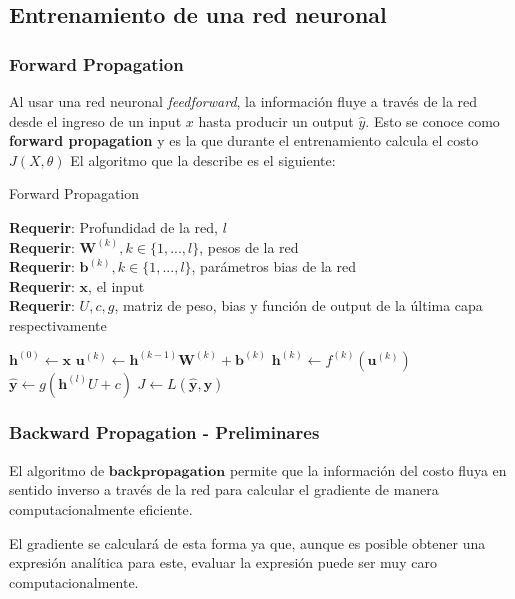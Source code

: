 \subsection{Entrenamiento de una red neuronal}

\subsubsection{Forward Propagation}

Al usar una red neuronal \textit{feedforward}, la información fluye a través de la red desde el ingreso de un input $x$ hasta producir un output $\hat{y}$. Esto se conoce como \textbf{forward propagation} y es la que durante el entrenamiento calcula el costo $J(X, \theta)$ 
El algoritmo que la describe es el siguiente:

\begin{algorithm}[H] %
	\caption{Forward Propagation}\label{ML:Algorithm1}
	\textbf{Requerir}: Profundidad de la red, $l$ \\
	\textbf{Requerir}: $\bm{W}^{(k)}, k \in \{1,...,l\}$, pesos de la red \\
	\textbf{Requerir}: $\bm{b}^{(k)}, k \in \{1,...,l\}$, parámetros bias de la red \\
	\textbf{Requerir}: $\bm{x}$, el input \\
	\textbf{Requerir}: $U,c,g$, matriz de peso, bias y función de output de la última capa respectivamente 
	\begin{algorithmic}[1]
		\State $\bm{h}^{(0)} \gets \bm{x}$
			\State $\bm{u}^{(k)} \gets  \bm{h}^{(k-1)}\bm{W}^{(k)} + \bm{b}^{(k)}$
			\State $\bm{h}^{(k)} \gets f^{(k)}(\bm{u}^{(k)})$
		\EndFor
		\State $\bm{\hat{y}} \gets g(\bm{h}^{(l)}U+c)$
		\State $J \gets L(\bm{\hat{y}},\bm{y})$
	\end{algorithmic}

\end{algorithm}


\subsubsection{Backward Propagation - Preliminares}

El algoritmo de $\textbf{backpropagation}$ permite que la información del costo fluya en sentido inverso a través de la red para calcular el gradiente de manera computacionalmente eficiente. 

El gradiente se calculará de esta forma ya que, aunque es posible obtener una expresión analítica para este, evaluar la expresión puede ser muy caro computacionalmente. 

